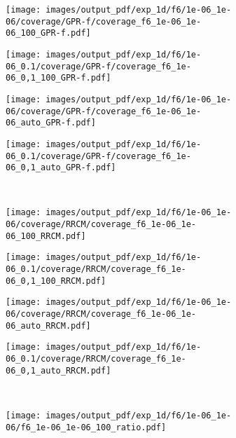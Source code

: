 \documentclass[a4paper,14pt]{extarticle}
\begin{document}
\begin{figure}%
  \centering
  \begin{subfigure}[b]{0.25\linewidth}
    \texttt{[image: images/output\_pdf/exp\_1d/f6/1e-06\_1e-06/coverage/GPR-f/coverage\_f6\_1e-06\_1e-06\_100\_GPR-f.pdf]}
  \end{subfigure}%
  \begin{subfigure}[b]{0.25\linewidth}
    \texttt{[image: images/output\_pdf/exp\_1d/f6/1e-06\_0.1/coverage/GPR-f/coverage\_f6\_1e-06\_0,1\_100\_GPR-f.pdf]}
  \end{subfigure}%
  \begin{subfigure}[b]{0.25\linewidth}
    \texttt{[image: images/output\_pdf/exp\_1d/f6/1e-06\_1e-06/coverage/GPR-f/coverage\_f6\_1e-06\_1e-06\_auto\_GPR-f.pdf]}
  \end{subfigure}%
  \begin{subfigure}[b]{0.25\linewidth}
    \texttt{[image: images/output\_pdf/exp\_1d/f6/1e-06\_0.1/coverage/GPR-f/coverage\_f6\_1e-06\_0,1\_auto\_GPR-f.pdf]}
  \end{subfigure}\\
  \begin{subfigure}[b]{0.25\linewidth}
    \texttt{[image: images/output\_pdf/exp\_1d/f6/1e-06\_1e-06/coverage/RRCM/coverage\_f6\_1e-06\_1e-06\_100\_RRCM.pdf]}
  \end{subfigure}%
  \begin{subfigure}[b]{0.25\linewidth}
    \texttt{[image: images/output\_pdf/exp\_1d/f6/1e-06\_0.1/coverage/RRCM/coverage\_f6\_1e-06\_0,1\_100\_RRCM.pdf]}
  \end{subfigure}%
  \begin{subfigure}[b]{0.25\linewidth}
    \texttt{[image: images/output\_pdf/exp\_1d/f6/1e-06\_1e-06/coverage/RRCM/coverage\_f6\_1e-06\_1e-06\_auto\_RRCM.pdf]}
  \end{subfigure}%
  \begin{subfigure}[b]{0.25\linewidth}
    \texttt{[image: images/output\_pdf/exp\_1d/f6/1e-06\_0.1/coverage/RRCM/coverage\_f6\_1e-06\_0,1\_auto\_RRCM.pdf]}
  \end{subfigure}\\
  \begin{subfigure}[b]{0.25\linewidth}
    \texttt{[image: images/output\_pdf/exp\_1d/f6/1e-06\_1e-06/f6\_1e-06\_1e-06\_100\_ratio.pdf]}
    \caption{} \label{fig:f6_1d_low_noise_c1}
  \end{subfigure}%

\end{figure}
\end{document}
